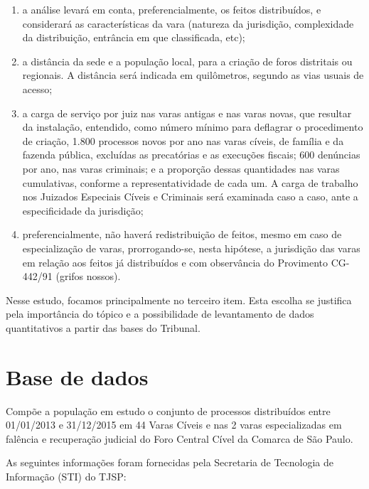 \documentclass[]{book}
\providecommand{\tightlist}{%
  \setlength{\itemsep}{0pt}\setlength{\parskip}{0pt}}
\begin{document}
\begin{enumerate}
\def\labelenumi{\arabic{enumi}.}
\tightlist
\item
  a análise levará em conta, preferencialmente, os feitos distribuídos,
  e considerará as características da vara (natureza da jurisdição,
  complexidade da distribuição, entrância em que classificada, etc);
\item
  a distância da sede e a população local, para a criação de foros
  distritais ou regionais. A distância será indicada em quilômetros,
  segundo as vias usuais de acesso;
\item
  a carga de serviço por juiz nas varas antigas e nas varas novas, que
  resultar da instalação, entendido, como número mínimo para deflagrar o
  procedimento de criação, 1.800 processos novos por ano nas varas
  cíveis, de família e da fazenda pública, excluídas as precatórias e as
  execuções fiscais; 600 denúncias por ano, nas varas criminais; e a
  proporção dessas quantidades nas varas cumulativas, conforme a
  representatividade de cada um. A carga de trabalho nos Juizados
  Especiais Cíveis e Criminais será examinada caso a caso, ante a
  especificidade da jurisdição;
\item
  preferencialmente, não haverá redistribuição de feitos, mesmo em caso
  de especialização de varas, prorrogando-se, nesta hipótese, a
  jurisdição das varas em relação aos feitos já distribuídos e com
  observância do Provimento CG- 442/91 (grifos nossos).
\end{enumerate}

Nesse estudo, focamos principalmente no terceiro item. Esta escolha se
justifica pela importância do tópico e a possibilidade de levantamento
de dados quantitativos a partir das bases do Tribunal.

\section{Base de dados}\label{base-de-dados}

Compõe a população em estudo o conjunto de processos distribuídos entre
01/01/2013 e 31/12/2015 em 44 Varas Cíveis e nas 2 varas especializadas
em falência e recuperação judicial do Foro Central Cível da Comarca de
São Paulo.

As seguintes informações foram fornecidas pela Secretaria de Tecnologia
de Informação (STI) do TJSP:
\end{document}
